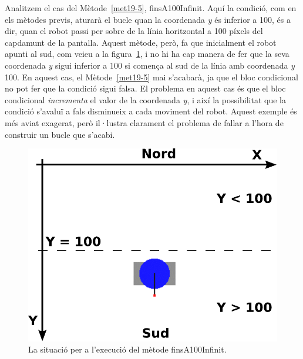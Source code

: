 Analitzem el cas del Mètode~\ref{met19-5}, \textsf{finsA100Infinit}. Aquí la condició, com en els mètodes previs, aturarà el bucle quan la coordenada \emph{y} és inferior a 100, és a dir, quan el robot passi per sobre de la línia horitzontal a 100 píxels del capdamunt de la pantalla. Aquest mètode, però, fa que inicialment el robot apunti al sud, com veieu a la figura~\ref{fig1905}, i no hi ha cap manera de fer que la seva coordenada \emph{y} sigui inferior a 100 si comença al sud de la línia amb coordenada \emph{y} 100. En aquest cas, el Mètode~\ref{met19-5} mai s'acabarà, ja que el bloc condicional no pot fer que la condició sigui falsa. El problema en aquest cas és que el bloc condicional \emph{incrementa} el valor de la coordenada \emph{y}, i així la possibilitat que la condició s'avaluï a fals disminueix a cada moviment del robot. Aquest exemple és més aviat exagerat, però il·lustra clarament el problema de fallar a l'hora de construir un bucle que s'acabi. 
\begin{figure}[h!]
\begin{center}
\includegraphics[scale=0.5]{Imatges/figura19-5.pdf}
\end{center}
\caption{La situació per a l'execució del mètode \textsf{\upshape finsA100Infinit}.}
\label{fig1905}
\end{figure}


